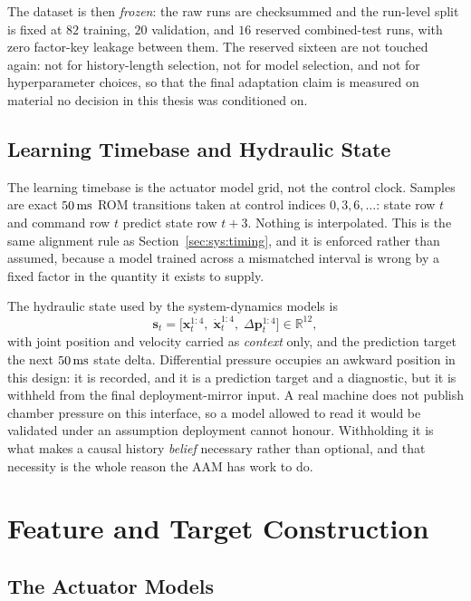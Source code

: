 The dataset is then \emph{frozen}: the raw runs are checksummed and the
run-level split is fixed at $82$ training, $20$ validation, and $16$
reserved combined-test runs, with zero factor-key leakage between them.
The reserved sixteen are not touched again:
not for history-length selection, not for model selection, and not for
hyperparameter choices, so that the final adaptation claim is measured on material no decision
in this thesis was conditioned on.

\subsection{Learning Timebase and Hydraulic State}

The learning timebase is the actuator model grid, not the control clock.
Samples are exact $\unit[50]{ms}$ ROM transitions taken at control
indices $0, 3, 6, \dots$: state row $t$ and command row $t$ predict
state row $t+3$. Nothing is interpolated. This is the same alignment
rule as Section~\ref{sec:sys:timing}, and it is enforced rather than
assumed, because a model trained across a mismatched interval is wrong by a fixed factor in the quantity it exists to supply.

The hydraulic state used by the system-dynamics models is
%
\begin{equation}
  \label{eq:data:sdstate}
  \bm{s}_t = \bigl[\bm{x}_t^{1:4},\; \dot{\bm{x}}_t^{1:4},\;
  \Delta\bm{p}_t^{1:4}\bigr] \in \mathbb{R}^{12},
\end{equation}
%
with joint position and velocity carried as \emph{context} only, and the
prediction target the next $\unit[50]{ms}$ state delta. Differential
pressure occupies an awkward position in this design: it is
recorded, and it is a prediction target and a diagnostic, but it is
withheld from the final deployment-mirror input. A real machine does not
publish chamber pressure on this interface, so a model allowed to read
it would be validated under an assumption deployment cannot honour.
Withholding it is what makes a causal history \emph{belief} necessary
rather than optional, and that necessity is the whole reason the AAM has
work to do.

\section{Feature and Target Construction}
\label{sec:data:features}

\subsection{The Actuator Models}

